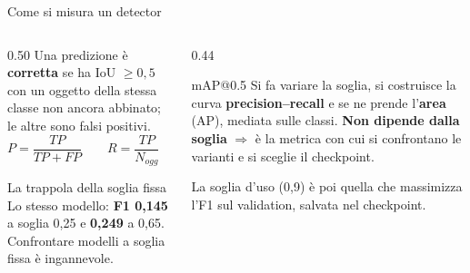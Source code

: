 \documentclass[aspectratio=169]{beamer}
\begin{document}
\begin{frame}{Come si misura un detector}
  \begin{columns}[T]
    \begin{column}{0.50\textwidth}
      Una predizione è \textbf{corretta} se ha IoU $\geq 0{,}5$ con un oggetto della
      stessa classe non ancora abbinato; le altre sono falsi positivi.
      \[ P=\frac{TP}{TP+FP}\qquad R=\frac{TP}{N_{ogg}}\qquad F_1=\frac{2PR}{P+R} \]
      \begin{alertblock}{La trappola della soglia fissa}
        Lo stesso modello: \textbf{F1 0,145} a soglia 0,25 e \textbf{0,249} a 0,65.
        Confrontare modelli a soglia fissa è ingannevole.
      \end{alertblock}
    \end{column}
    \begin{column}{0.44\textwidth}
      \begin{block}{mAP@0.5}
        Si fa variare la soglia, si costruisce la curva \textbf{precision--recall} e
        se ne prende l'\textbf{area} (AP), mediata sulle classi.
        \textbf{Non dipende dalla soglia} $\Rightarrow$ è la metrica con cui si
        confrontano le varianti e si sceglie il checkpoint.
      \end{block}
      {\footnotesize La soglia d'uso (0,9) è poi quella che massimizza l'F1 sul
      validation, salvata nel checkpoint.}
    \end{column}
  \end{columns}
\end{frame}
\end{document}

